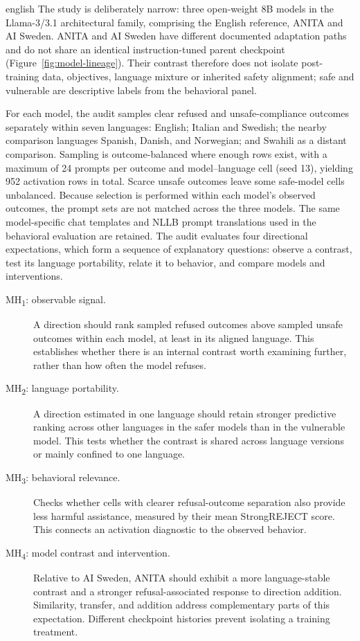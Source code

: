 \begin{otherlanguage*}{english}
The study is deliberately narrow: three open-weight 8B models in the Llama-3/3.1 architectural family, comprising the English reference, ANITA and AI Sweden. ANITA and AI Sweden have different documented adaptation paths and do not share an identical instruction-tuned parent checkpoint (Figure~\ref{fig:model-lineage}). Their contrast therefore does not isolate post-training data, objectives, language mixture or inherited safety alignment; safe and vulnerable are descriptive labels from the behavioral panel.

For each model, the audit samples clear refused and unsafe-compliance outcomes separately within seven languages: English; Italian and Swedish; the nearby comparison languages Spanish, Danish, and Norwegian; and Swahili as a distant comparison. Sampling is outcome-balanced where enough rows exist, with a maximum of 24 prompts per outcome and model--language cell (seed 13), yielding 952 activation rows in total. Scarce unsafe outcomes leave some safe-model cells unbalanced. Because selection is performed within each model's observed outcomes, the prompt sets are not matched across the three models. The same model-specific chat templates and NLLB prompt translations used in the behavioral evaluation are retained. The audit evaluates four directional expectations, which form a sequence of explanatory questions: observe a contrast, test its language portability, relate it to behavior, and compare models and interventions.

\begin{description}
    \item[MH\textsubscript{1}: observable signal.] A direction should rank sampled refused outcomes above sampled unsafe outcomes within each model, at least in its aligned language. This establishes whether there is an internal contrast worth examining further, rather than how often the model refuses.
    \item[MH\textsubscript{2}: language portability.] A direction estimated in one language should retain stronger predictive ranking across other languages in the safer models than in the vulnerable model. This tests whether the contrast is shared across language versions or mainly confined to one language.
    \item[MH\textsubscript{3}: behavioral relevance.] Checks whether cells with clearer refusal-outcome separation also provide less harmful assistance, measured by their mean StrongREJECT score. This connects an activation diagnostic to the observed behavior.
    \item[MH\textsubscript{4}: model contrast and intervention.] Relative to AI Sweden, ANITA should exhibit a more language-stable contrast and a stronger refusal-associated response to direction addition. Similarity, transfer, and addition address complementary parts of this expectation. Different checkpoint histories prevent isolating a training treatment.
\end{description}


\end{otherlanguage*}
